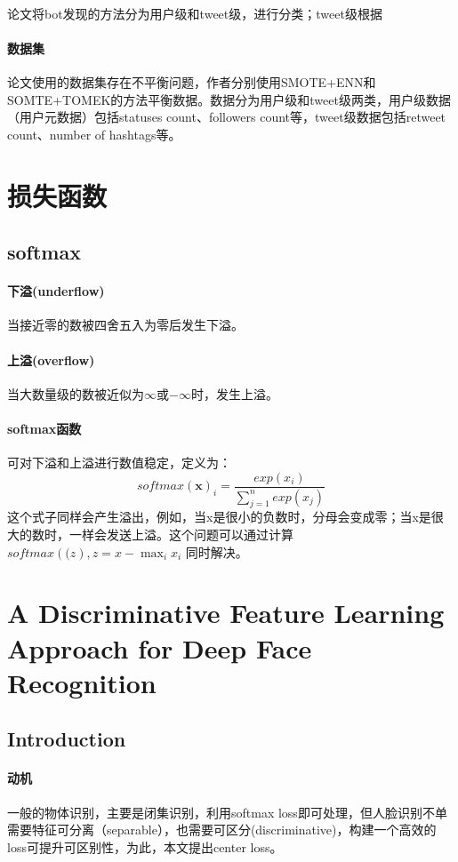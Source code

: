 \documentclass[10pt,letterpaper]{article}
\begin{document}
\paragraph{} 论文将bot发现的方法分为用户级和tweet级，进行分类；tweet级根据
\paragraph{数据集} 论文使用的数据集存在不平衡问题，作者分别使用SMOTE+ENN和SOMTE+TOMEK的方法平衡数据。数据分为用户级和tweet级两类，用户级数据（用户元数据）包括statuses count、followers count等，tweet级数据包括retweet count、number of hashtags等。

\newpage
\section{损失函数}
\subsection{softmax}
\paragraph{下溢(underflow)} 当接近零的数被四舍五入为零后发生下溢。
\paragraph{上溢(overflow)} 当大数量级的数被近似为$\infty$或$-\infty$时，发生上溢。 
\paragraph{softmax函数}可对下溢和上溢进行数值稳定，定义为：
\begin{equation}
	softmax(\mathbf{x})_i = \frac{exp(x_i)}{\sum^n_{j=1}exp(x_j)}
\end{equation}
这个式子同样会产生溢出，例如，当x是很小的负数时，分母会变成零；当x是很大的数时，一样会发送上溢。这个问题可以通过计算$softmax(\mathbf(z), z=x-\max_ix_i$ 同时解决。

\newpage
\section{A Discriminative Feature Learning Approach for Deep Face Recognition \cite{centerloss}}
\subsection{Introduction}
\paragraph{动机} 一般的物体识别，主要是闭集识别，利用softmax loss即可处理，但人脸识别不单需要特征可分离（separable），也需要可区分(discriminative)，构建一个高效的loss可提升可区别性，为此，本文提出center loss。
\end{document}

